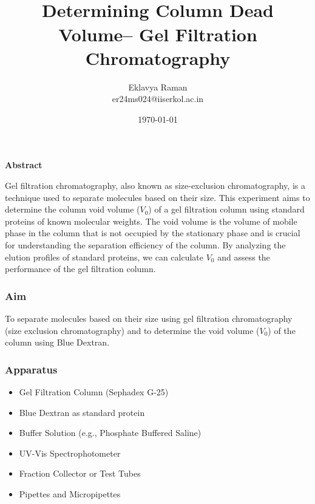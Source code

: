 \documentclass[openany]{book}
\begin{document}
\title{\Large{} \\ \vspace{5pt}
\large{Determining Column Dead Volume– Gel Filtration Chromatography}}
\author{Eklavya Raman \\ \vspace{5pt} er24ms024@iiserkol.ac.in \\ \vspace{5pt}}
\date{\today}
\maketitle
\begin{center}
    \textbf{Abstract}
\end{center}
    Gel filtration chromatography, also known as size-exclusion chromatography, is a technique used to separate molecules based on their size. This experiment aims to determine the column void volume ($V_0$) of a gel filtration column using standard proteins of known molecular weights. The void volume is the volume of mobile phase in the column that is not occupied by the stationary phase and is crucial for understanding the separation efficiency of the column. By analyzing the elution profiles of standard proteins, we can calculate $V_0$ and assess the performance of the gel filtration column.
\subsubsection{Aim}
To separate molecules based on their size using gel filtration chromatography (size exclusion chromatography) and to determine the void volume ($V_0$) of the column using Blue Dextran.
\subsubsection{Apparatus}
\begin{itemize}
    \item Gel Filtration Column (Sephadex G-25)
    \item Blue Dextran as standard protein
    \item Buffer Solution (e.g., Phosphate Buffered Saline)
    \item UV-Vis Spectrophotometer
    \item Fraction Collector or Test Tubes
    \item Pipettes and Micropipettes
\end{itemize}
\end{document}
